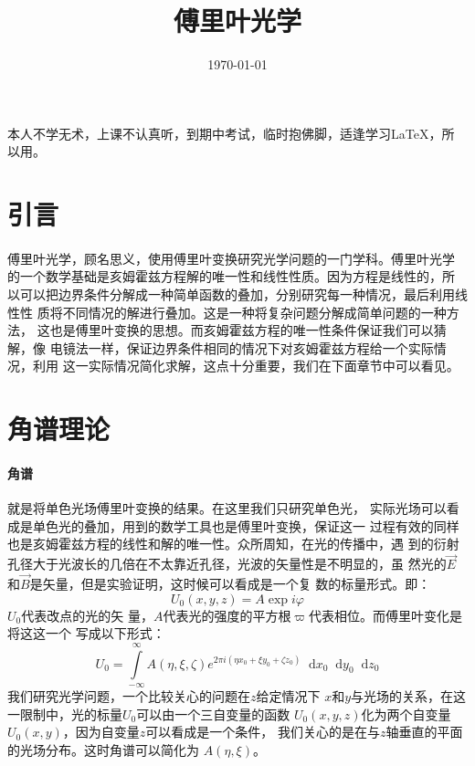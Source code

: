 \documentclass{article}
\title{傅里叶光学}
\date{\today}
\newcommand*{\dif}{\mathop{}\!\mathrm{d}}
\begin{document}
\maketitle
\tableofcontents
本人不学无术，上课不认真听，到期中考试，临时抱佛脚，适逢学习\LaTeX，所
以用。
\section{引言}
\paragraph{}
傅里叶光学，顾名思义，使用傅里叶变换研究光学问题的一门学科。傅里叶光学
的一个数学基础是亥姆霍兹方程解的唯一性和线性性质。因为方程是线性的，所
以可以把边界条件分解成一种简单函数的叠加，分别研究每一种情况，最后利用线性性
质将不同情况的解进行叠加。这是一种将复杂问题分解成简单问题的一种方法，
这也是傅里叶变换的思想。而亥姆霍兹方程的唯一性条件保证我们可以猜解，像
电镜法一样，保证边界条件相同的情况下对亥姆霍兹方程给一个实际情况，利用
这一实际情况简化求解，这点十分重要，我们在下面章节中可以看见。
\section{角谱理论}
\paragraph{角谱}就是将单色光场傅里叶变换的结果。在这里我们只研究单色光，
实际光场可以看成是单色光的叠加，用到的数学工具也是傅里叶变换，保证这一
过程有效的同样也是亥姆霍兹方程的线性和解的唯一性。众所周知，在光的传播中，遇
到的衍射孔径大于光波长的几倍在不太靠近孔径，光波的矢量性是不明显的，虽
然光的$\vec{E}$和$\vec{B}$是矢量，但是实验证明，这时候可以看成是一个复
数的标量形式。即：\[U_0(x,y,z)=A\exp{i\varphi}\] $U_0$代表改点的光的矢
量，$A$代表光的强度的平方根$\varpi$代表相位。而傅里叶变化是将这这一个
写成以下形式：
\[U_0=\int\limits_{-\infty}^{\infty}A(\eta,\xi,\zeta)e^{2\pi i(\eta
    x_0+\xi y_0+\zeta z_0)}\dif x_0 \dif
  y_0 \dif z_0\]我们研究光学问题，一个比较关心的问题在$z$给定情况下
$x$和$y$与光场的关系，在这一限制中，光的标量$U_0$可以由一个三自变量的函数
$U_0(x,y,z)$化为两个自变量$U_0(x,y)$，因为自变量$z$可以看成是一个条件，
我们关心的是在与$z$轴垂直的平面的光场分布。这时角谱可以简化为
$A(\eta,\xi)$。
\end{document}
